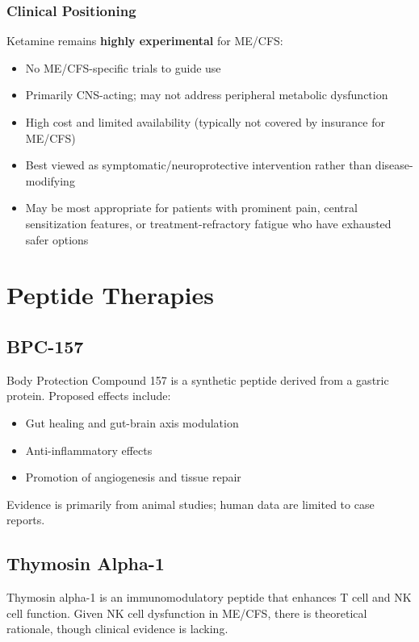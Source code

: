 \subsubsection{Clinical Positioning}

Ketamine remains \textbf{highly experimental} for ME/CFS:
\begin{itemize}
    \item No ME/CFS-specific trials to guide use
    \item Primarily CNS-acting; may not address peripheral metabolic dysfunction
    \item High cost and limited availability (typically not covered by insurance for ME/CFS)
    \item Best viewed as symptomatic/neuroprotective intervention rather than disease-modifying
    \item May be most appropriate for patients with prominent pain, central sensitization features, or treatment-refractory fatigue who have exhausted safer options
\end{itemize}

\section{Peptide Therapies}
\label{sec:peptides}

\subsection{BPC-157}

Body Protection Compound 157 is a synthetic peptide derived from a gastric protein. Proposed effects include:
\begin{itemize}
    \item Gut healing and gut-brain axis modulation
    \item Anti-inflammatory effects
    \item Promotion of angiogenesis and tissue repair
\end{itemize}
Evidence is primarily from animal studies; human data are limited to case reports.

\subsection{Thymosin Alpha-1}

Thymosin alpha-1 is an immunomodulatory peptide that enhances T cell and NK cell function. Given NK cell dysfunction in ME/CFS, there is theoretical rationale, though clinical evidence is lacking.

